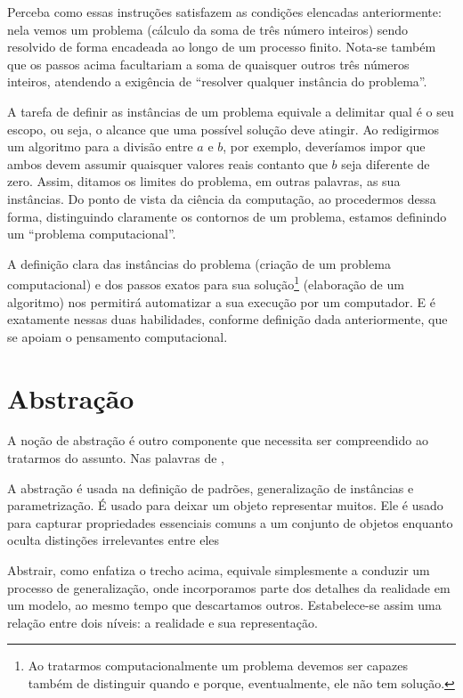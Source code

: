 Perceba como essas instruções satisfazem as condições elencadas anteriormente: nela vemos um problema (cálculo da soma de três número inteiros) sendo resolvido de forma encadeada ao longo de um processo finito. Nota-se também que os passos acima facultariam a soma de quaisquer outros três números inteiros, atendendo a exigência de ``resolver qualquer instância do problema''. 

A tarefa de definir as instâncias de um problema equivale a delimitar qual é o seu escopo, ou seja, o alcance que uma possível solução deve atingir. Ao redigirmos um algoritmo para a divisão entre $a$ e $b$, por exemplo, deveríamos impor que ambos devem assumir quaisquer valores reais contanto que $b$ seja diferente de zero. Assim, ditamos os limites do problema, em outras palavras, as sua instâncias. Do ponto de vista da ciência da computação, ao procedermos dessa forma, distinguindo claramente os contornos de um problema, estamos definindo um ``problema computacional''.

A definição clara das instâncias do problema (criação de um problema computacional) e dos passos exatos para sua solução\footnote{Ao tratarmos computacionalmente um problema devemos ser capazes também de distinguir quando e porque, eventualmente, ele não tem solução.} (elaboração de um algoritmo) nos permitirá automatizar a sua execução por um computador. E é exatamente nessas duas habilidades, conforme definição dada anteriormente, que se apoiam o pensamento computacional.

\section{Abstração}

A noção de abstração é outro componente que necessita ser compreendido ao tratarmos do assunto. Nas palavras de ,

\begin{citacao}
A abstração é usada na definição de padrões, generalização de instâncias e parametrização. É usado para deixar um objeto representar muitos. Ele é usado para capturar propriedades essenciais comuns a um conjunto de objetos enquanto oculta distinções irrelevantes entre eles \cite[p.~1. Tradução nossa]{wing2006}
\end{citacao}

Abstrair, como enfatiza o trecho acima, equivale simplesmente a conduzir um processo de generalização, onde incorporamos parte dos detalhes da realidade em um modelo, ao mesmo tempo que descartamos outros. Estabelece-se assim uma relação entre dois níveis: a realidade e sua representação.

